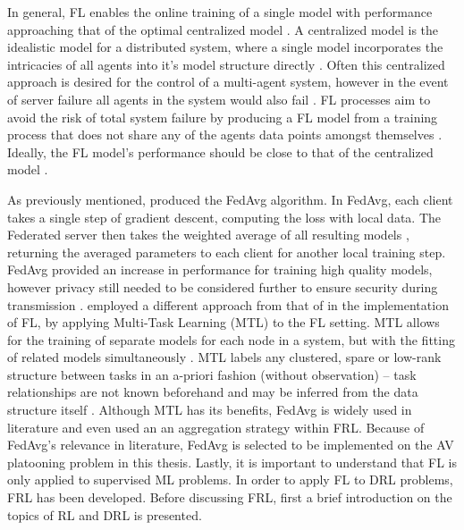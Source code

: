 In general, FL enables the online training of a single model with performance approaching
that of the optimal centralized model \cite{Yang2019a}. A centralized model is the
idealistic model for a distributed system, where a single model incorporates the intricacies
of all agents into it's model structure directly \cite{Yang2019a}.  Often this centralized
approach is desired for the control of a multi-agent system, however in the event of server
failure all agents in the system would also fail \cite{Long2018}.  FL processes aim to
avoid the risk of total system failure by producing a FL model from a training process
that does not share any of the agents data points amongst themselves \cite{Yang2019a}.
Ideally, the FL  model's performance should be close to that of the centralized model
\cite{Yang2019a}.

As previously mentioned, \cite{BrendanMcMahan2017a} produced the FedAvg algorithm.  In
FedAvg, each client takes a single step of gradient descent, computing the loss with
local data. The Federated server then takes the weighted average of all resulting models
\cite{BrendanMcMahan2017a}, returning the averaged parameters to each client for another
local training step.  FedAvg provided an increase in performance for training high
quality models, however privacy still needed to be considered further to ensure security
during transmission \cite{BrendanMcMahan2017a}. \cite{Smith2017} employed a different
approach from that of \cite{Yang2019a, BrendanMcMahan2017a} in the implementation of FL,
by applying Multi-Task Learning (MTL) to the FL setting.  MTL allows for the training of
separate models for each node in a system, but with the fitting of related models
simultaneously \cite{Smith2017}. MTL labels any clustered, spare or low-rank structure
between tasks in an a-priori fashion (without observation) -- task relationships are not
known beforehand and may be inferred from the data structure itself \cite{Smith2017}.
Although MTL has its benefits, FedAvg is widely used in literature and even used an an
aggregation strategy within FRL. Because of FedAvg's relevance in literature, FedAvg is
selected to be implemented on the AV platooning problem in this thesis. Lastly, it is
important to understand that FL is only applied to supervised ML problems.  In order to
apply FL to DRL problems, FRL has been developed. Before discussing FRL, first a brief
introduction on the topics of RL and DRL is presented.

